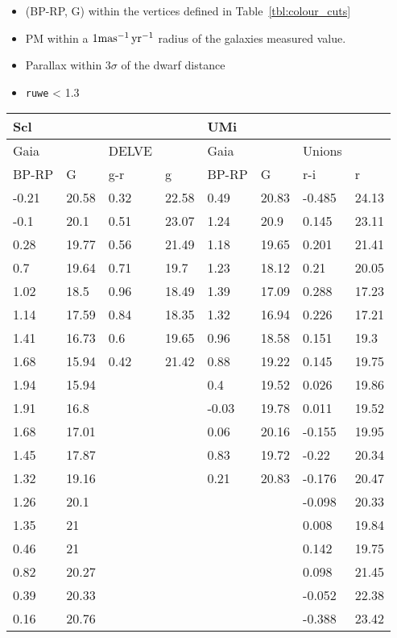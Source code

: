 \begin{itemize}
\tightlist
\item
  (BP-RP, G) within the vertices defined in Table~\ref{tbl:colour_cuts}
\item
  PM within a \(1{\rm mas^{-1}\,yr^{-1}}\) radius of the galaxies measured value.
\item
  Parallax within \(3\sigma\) of the dwarf distance
\item
  \texttt{ruwe} \textless{} 1.3
\end{itemize}

\begin{table*}[t]
\centering
\caption[Colour cuts for density profiles.]{Colour cuts used in samples in this section. Each pair of columns contains the vertices of a polygon in the CMD within which we select stars to derive density profiles. }
\label{tbl:colour_cuts}
\begin{tabular}{llllllll}
\toprule
Scl &  &  &  & UMi &  &  & \\
\midrule
Gaia &  & DELVE &  & Gaia &  & Unions & \\
BP-RP & G & g-r & g & BP-RP & G & r-i & r\\
-0.21 & 20.58 & 0.32 & 22.58 & 0.49 & 20.83 & -0.485 & 24.13\\
-0.1 & 20.1 & 0.51 & 23.07 & 1.24 & 20.9 & 0.145 & 23.11\\
0.28 & 19.77 & 0.56 & 21.49 & 1.18 & 19.65 & 0.201 & 21.41\\
0.7 & 19.64 & 0.71 & 19.7 & 1.23 & 18.12 & 0.21 & 20.05\\
1.02 & 18.5 & 0.96 & 18.49 & 1.39 & 17.09 & 0.288 & 17.23\\
1.14 & 17.59 & 0.84 & 18.35 & 1.32 & 16.94 & 0.226 & 17.21\\
1.41 & 16.73 & 0.6 & 19.65 & 0.96 & 18.58 & 0.151 & 19.3\\
1.68 & 15.94 & 0.42 & 21.42 & 0.88 & 19.22 & 0.145 & 19.75\\
1.94 & 15.94 &  &  & 0.4 & 19.52 & 0.026 & 19.86\\
1.91 & 16.8 &  &  & -0.03 & 19.78 & 0.011 & 19.52\\
1.68 & 17.01 &  &  & 0.06 & 20.16 & -0.155 & 19.95\\
1.45 & 17.87 &  &  & 0.83 & 19.72 & -0.22 & 20.34\\
1.32 & 19.16 &  &  & 0.21 & 20.83 & -0.176 & 20.47\\
1.26 & 20.1 &  &  &  &  & -0.098 & 20.33\\
1.35 & 21 &  &  &  &  & 0.008 & 19.84\\
0.46 & 21 &  &  &  &  & 0.142 & 19.75\\
0.82 & 20.27 &  &  &  &  & 0.098 & 21.45\\
0.39 & 20.33 &  &  &  &  & -0.052 & 22.38\\
0.16 & 20.76 &  &  &  &  & -0.388 & 23.42\\
\bottomrule
\end{tabular}
\end{table*}

